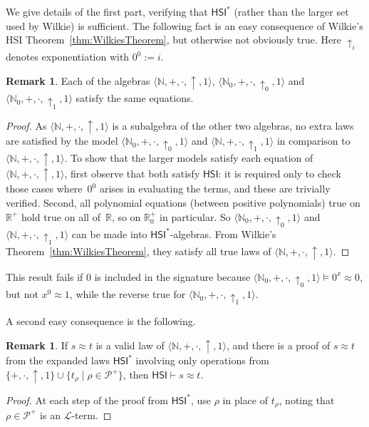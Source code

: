 \documentclass[eqnor,reqno]{amsart}
\theoremstyle{plain}
\theoremstyle{definition}
\newtheorem{remark}[thm]{Remark}
\newcommand{\HSI}{\textsf{HSI}}
\begin{document}
We give details of the first part, verifying that $\HSI^*$ (rather than the larger set used by Wilkie) is sufficient.  The following fact is an easy consequence of Wilkie's HSI Theorem~\ref{thm:WilkiesTheorem}, but otherwise not obviously true.  Here $\uparrow_i$ denotes exponentiation with $0^0:=i$.
\begin{remark}\label{eg:N0}
Each of the algebras $\langle \mathbb{N},+,\cdot,\uparrow,1\rangle$, $\langle \mathbb{N}_0,+,\cdot,\uparrow_0,1\rangle$ and $\langle \mathbb{N}_0,+,\cdot,\uparrow_1,1\rangle$ satisfy the same equations.
\end{remark}
\begin{proof}
As $\langle \mathbb{N},+,\cdot,\uparrow,1\rangle$ is a subalgebra of the other two algebras,  no extra laws are satisfied by the model $\langle \mathbb{N}_0,+,\cdot,\uparrow_0,1\rangle$ and $\langle \mathbb{N},+,\cdot,\uparrow_1,1\rangle$ in comparison to $\langle \mathbb{N},+,\cdot,\uparrow,1\rangle$.  To show that the larger models satisfy each equation of $\langle \mathbb{N},+,\cdot,\uparrow,1\rangle$, first observe that both
 satisfy $\HSI$: it is required only to check those cases where~$0^0$ arises in evaluating the terms, and these are trivially verified.  Second, all polynomial equations (between positive polynomials) true on $\mathbb{R}^+$ hold true on all of~$\mathbb{R}$, so on $\mathbb{R}_0^+$ in particular.  So $\langle \mathbb{N}_0,+,\cdot,\uparrow_0,1\rangle$ and $\langle \mathbb{N},+,\cdot,\uparrow_1,1\rangle$ can be made into  $\HSI^*$-algebras.
 From Wilkie's Theorem~\ref{thm:WilkiesTheorem}, they satisfy all true laws of $\langle \mathbb{N},+,\cdot,\uparrow,1\rangle$.
\end{proof}
This result fails if $0$ is included in the signature because $\langle \mathbb{N}_0,+,\cdot,\uparrow_0,1\rangle\models 0^x\approx 0$, but not $x^0\approx 1$, while the reverse true for $\langle \mathbb{N}_0,+,\cdot,\uparrow_1,1\rangle$.

A second easy consequence is the following.
\begin{remark}\label{rem:HSIproof}
If $s\approx t$ is a valid law of $\langle \mathbb{N},+,\cdot,\uparrow,1\rangle$, and there is a  proof of $s\approx t$ from the expanded laws $\HSI^*$ involving only operations from $\{+,\cdot,\uparrow,1\}\cup\{t_\rho\mid \rho\in \mathcal{P}^+\}$, then $\HSI\vdash s\approx t$.
\end{remark}
\begin{proof}
At each step of the proof from $\HSI^*$, use $\rho$ in place of $t_\rho$, noting that $\rho\in \mathcal{P}^+$ is an $\mathscr{L}$-term.
\end{proof}
\end{document}
